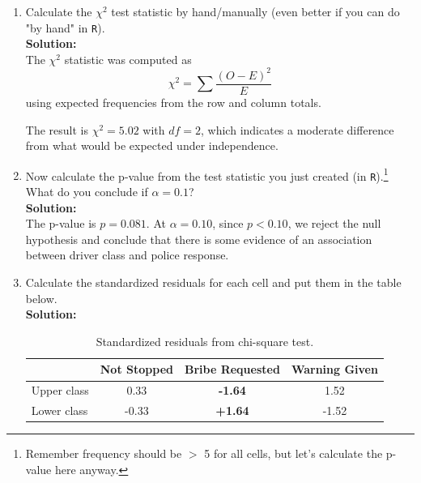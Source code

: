 \documentclass[12pt,letterpaper]{article}
\begin{document}
	\begin{enumerate}
		\item[(a)] Calculate the $\chi^2$ test statistic by hand/manually (even better if you can do "by hand" in \texttt{R}).\\
		
		\noindent \textbf{Solution:}\\
		The $\chi^2$ statistic was computed as 
		\[
		\chi^2 = \sum \frac{(O - E)^2}{E}
		\]
		using expected frequencies from the row and column totals.
		
		
		
		The result is $\chi^2 = 5.02$ with $df = 2$, which indicates a moderate difference from what would be expected under independence.
		
		\vspace{0.4cm}
		
		\item[(b)] Now calculate the p-value from the test statistic you just created (in \texttt{R}).\footnote{Remember frequency should be $>$ 5 for all cells, but let's calculate the p-value here anyway.}  What do you conclude if $\alpha = 0.1$?\\
		
		\noindent \textbf{Solution:}\\
		
		
		The p-value is $p = 0.081$.  
		At $\alpha = 0.10$, since $p < 0.10$, we reject the null hypothesis and conclude that there is some evidence of an association between driver class and police response.
		
		\vspace{0.5cm}
		
		\item[(c)] Calculate the standardized residuals for each cell and put them in the table below.\\
		
		\noindent \textbf{Solution:}\\
		
		
		\begin{table}[H]\centering
			\caption{\footnotesize Standardized residuals from chi-square test.}
			\begin{tabular}{l|ccc}
				& Not Stopped & Bribe Requested & Warning Given \\
				\hline
				Upper class & 0.33 & \textbf{-1.64} & 1.52 \\
				Lower class & -0.33 & \textbf{+1.64} & -1.52 \\
			\end{tabular}
		\end{table}
		

\end{enumerate}
\end{document}
